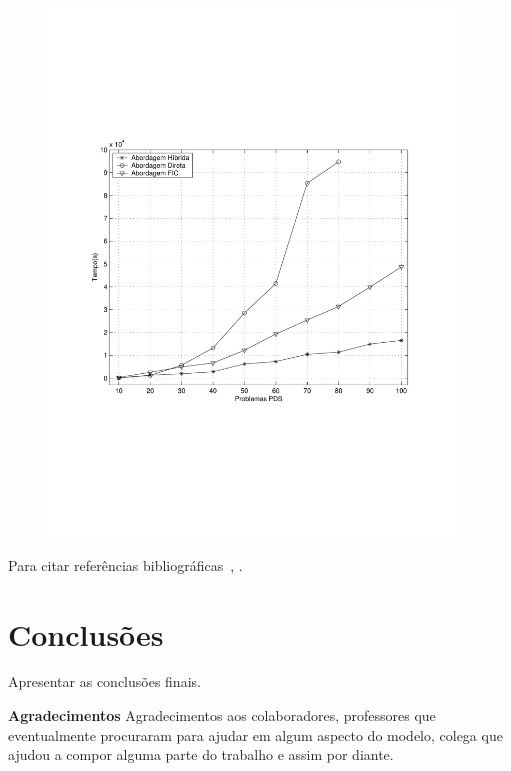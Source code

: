 \documentclass[12pt,fleqn]{article}
\begin{document}
\begin{figure}[htb]
	\centering
		\includegraphics[height=14cm]{figura}
	\label{fig:pdsmodel}
\end{figure}


Para citar referências bibliográficas~\cite{Adler89}, \cite{Carmo05}.

\section{Conclusões}
Apresentar as conclusões finais.

\vspace{5mm}
{\bf{Agradecimentos}} Agradecimentos aos colaboradores, professores que eventualmente procuraram para ajudar em
algum aspecto do modelo, colega que ajudou a compor alguma parte do trabalho e assim por diante.




\end{document}
